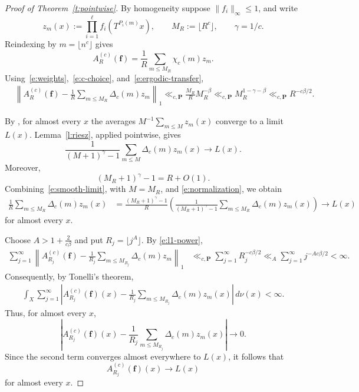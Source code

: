 \documentclass{amsart}
\newcommand{\1}{\mathbf 1}
\begin{document}
\begin{proof}[Proof of Theorem~\ref{t:pointwise}]
By homogeneity suppose $\|f_i\|_\infty\leq1$, and write
\[
 z_m(x):=\prod_{i=1}^{\ell}f_i(T^{P_i(m)}x),
 \qquad M_R:=\lfloor R^c\rfloor,\qquad \gamma=1/c.
\]
Reindexing by $m=\lfloor n^c\rfloor$ gives
\begin{equation}\label{e:ergodic-reindex}
 A_R^{(c)}(\mathbf f)=\frac1R\sum_{m\leq M_R}\chi_c(m)z_m.
\end{equation}
Using~\eqref{e:weights},~\eqref{e:c-choice}, and~\eqref{e:ergodic-transfer},
\begin{align}
 &\left\|A_R^{(c)}(\mathbf f)-\frac1R
 \sum_{m\leq M_R}\Delta_c(m)z_m\right\|_1\ll_{c,\mathbf P}\frac{M_R}{R}M_R^{-\beta}
 \ll_{c,\mathbf P}M_R^{1-\gamma-\beta}
 \ll_{c,\mathbf P}R^{-c\beta/2} .                   \label{e:l1-power}
\end{align}

By \cite[Theorem~1.3]{KMPWW}, for almost every $x$ the averages
$M^{-1}\sum_{m\leq M}z_m(x)$ converge to a limit $L(x)$.
Lemma~\ref{l:riesz}, applied pointwise, gives
\begin{equation}\label{e:smooth-limit}
 \frac1{(M+1)^\gamma-1}\sum_{m\leq M}\Delta_c(m)z_m(x)
 \longrightarrow L(x).
\end{equation}
Moreover,
\begin{equation}\label{e:normalization}
 (M_R+1)^\gamma-1=R+O(1).
\end{equation}
Combining~\eqref{e:smooth-limit}, with $M=M_R$, and
\eqref{e:normalization}, we obtain
\begin{align*}
 \frac1R\sum_{m\leq M_R}\Delta_c(m)z_m(x)
 &=
 \frac{(M_R+1)^\gamma-1}{R}
 \left(
 \frac1{(M_R+1)^\gamma-1}
 \sum_{m\leq M_R}\Delta_c(m)z_m(x)
 \right)\longrightarrow L(x)
\end{align*}
for almost every $x$.


Choose $A>1+ \frac{2}{c\beta}$ and put $R_j=\lfloor j^A\rfloor$.  By
\eqref{e:l1-power},
\begin{align*}
 \sum_{j=1}^{\infty}
 \left\|A_{R_j}^{(c)}(\mathbf f)-\frac1{R_j}
 \sum_{m\leq M_{R_j}}\Delta_c(m)z_m\right\|_1
 &\ll_{c,\mathbf P}\sum_{j=1}^{\infty}R_j^{-c\beta/2}\ll_A\sum_{j=1}^{\infty}j^{-Ac\beta/2}<\infty.
\end{align*}
Consequently, by Tonelli's theorem,
\begin{align*}
 \int_X\sum_{j=1}^{\infty}
 \left|A_{R_j}^{(c)}(\mathbf f)(x)-\frac1{R_j}
 \sum_{m\leq M_{R_j}}\Delta_c(m)z_m(x)\right|\,d\nu(x)<\infty.
\end{align*}
Thus, for almost every $x$,
\[
 \left|A_{R_j}^{(c)}(\mathbf f)(x)-\frac1{R_j}
 \sum_{m\leq M_{R_j}}\Delta_c(m)z_m(x)\right|\longrightarrow0.
\]
Since the second term converges almost everywhere to $L(x)$, it follows
that
\[
 A_{R_j}^{(c)}(\mathbf f)(x)\longrightarrow L(x)
\]
for almost every $x$.


\end{proof}
\end{document}
